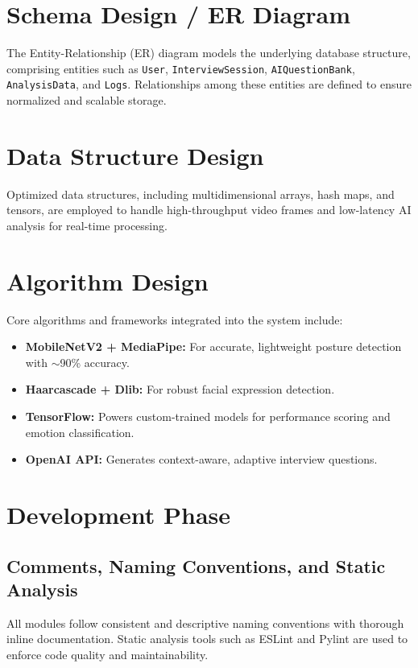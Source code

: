 \section{Schema Design / ER Diagram}
The Entity-Relationship (ER) diagram models the underlying database structure, comprising entities such as \texttt{User}, \texttt{InterviewSession}, \texttt{AIQuestionBank}, \texttt{AnalysisData}, and \texttt{Logs}. Relationships among these entities are defined to ensure normalized and scalable storage.

\section{Data Structure Design}
Optimized data structures, including multidimensional arrays, hash maps, and tensors, are employed to handle high-throughput video frames and low-latency AI analysis for real-time processing.

\section{Algorithm Design}
Core algorithms and frameworks integrated into the system include:

\begin{itemize}
  \item \textbf{MobileNetV2 + MediaPipe:} For accurate, lightweight posture detection with $\sim$90\% accuracy.
  \item \textbf{Haarcascade + Dlib:} For robust facial expression detection.
  \item \textbf{TensorFlow:} Powers custom-trained models for performance scoring and emotion classification.
  \item \textbf{OpenAI API:} Generates context-aware, adaptive interview questions.
\end{itemize}

\section{Development Phase}

\subsection{Comments, Naming Conventions, and Static Analysis}
All modules follow consistent and descriptive naming conventions with thorough inline documentation. Static analysis tools such as ESLint and Pylint are used to enforce code quality and maintainability.

